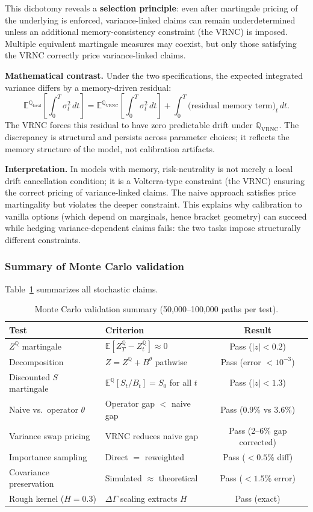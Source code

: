 \documentclass[11pt]{article}
\theoremstyle{plain}
\theoremstyle{definition}
\theoremstyle{remark}
\newcommand{\E}{\mathbb{E}}
\newcommand{\QQ}{\mathbb{Q}}
\newcommand{\dGamma}{\Delta\Gamma}
\begin{document}
This dichotomy reveals a \textbf{selection principle}: even after martingale
pricing of the underlying is enforced, variance-linked claims can remain
underdetermined unless an additional memory-consistency constraint (the VRNC)
is imposed. Multiple equivalent martingale measures may coexist, but only
those satisfying the VRNC correctly price variance-linked claims.

\textbf{Mathematical contrast.} Under the two specifications, the expected
integrated variance differs by a memory-driven residual:
\[
\E^{\QQ_{\text{local}}}\!\left[\int_0^T \sigma_t^2\,dt\right]
= \E^{\QQ_{\text{VRNC}}}\!\left[\int_0^T \sigma_t^2\,dt\right]
+ \int_0^T \text{(residual memory term)}_t\,dt.
\]
The VRNC forces this residual to have zero predictable drift under
$\QQ_{\text{VRNC}}$. The discrepancy is structural and persists across
parameter choices; it reflects the memory structure of the model, not
calibration artifacts.

\textbf{Interpretation.} In models with memory, risk-neutrality is not merely a
local drift cancellation condition; it is a Volterra-type constraint (the VRNC)
ensuring the correct pricing of variance-linked claims. The naive approach
satisfies price martingality but violates the deeper constraint. This explains
why calibration to vanilla options (which depend on marginals, hence bracket
geometry) can succeed while hedging variance-dependent claims fails: the two
tasks impose structurally different constraints.

\subsubsection{Summary of Monte Carlo validation}

Table~\ref{tab:mc-summary} summarizes all stochastic claims.

\begin{table}[h]
\centering
\caption{Monte Carlo validation summary (50{,}000--100{,}000 paths per test).}
\label{tab:mc-summary}
\begin{tabular}{lp{5.5cm}c}
\hline
\textbf{Test} & \textbf{Criterion} & \textbf{Result} \\
\hline
$Z^{\QQ}$ martingale & $\E[Z^{\QQ}_T - Z^{\QQ}_t] \approx 0$ & Pass ($|z| < 0.2$) \\
Decomposition & $Z = Z^{\QQ} + B^\theta$ pathwise & Pass (error $< 10^{-3}$) \\
Discounted $S$ martingale & $\E^{\QQ}[S_t/B_t] = S_0$ for all $t$ & Pass ($|z| < 1.3$) \\
Naive vs.\ operator $\theta$ & Operator gap $<$ naive gap & Pass (0.9\% vs 3.6\%) \\
Variance swap pricing & VRNC reduces naive gap & Pass (2--6\% gap corrected) \\
Importance sampling & Direct $=$ reweighted & Pass ($< 0.5\%$ diff) \\
Covariance preservation & Simulated $\approx$ theoretical & Pass ($< 1.5\%$ error) \\
Rough kernel ($H = 0.3$) & $\dGamma$ scaling extracts $H$ & Pass (exact) \\
\hline
\end{tabular}
\end{table}
\end{document}
